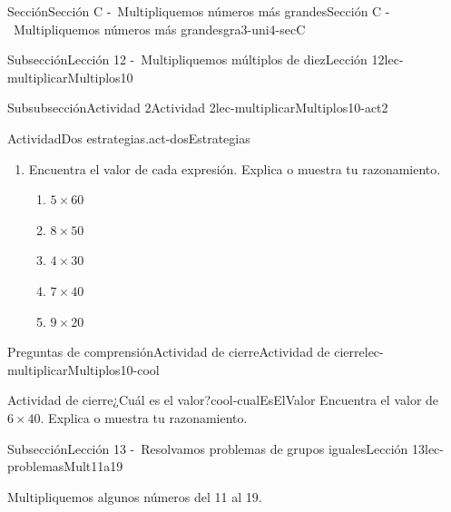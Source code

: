 \documentclass[twoside,10pt,]{article}
\begin{document}
\begin{sectionptx}{Sección}{Sección C -~Multipliquemos números más grandes}{}{Sección C -~Multipliquemos números más grandes}{}{}{gra3-uni4-secC}
\begin{subsectionptx}{Subsección}{Lección 12 -~Multipliquemos múltiplos de diez}{}{Lección 12}{}{}{lec-multiplicarMultiplos10}
\begin{subsubsectionptx}{Subsubsección}{Actividad 2}{}{Actividad 2}{}{}{lec-multiplicarMultiplos10-act2}
\begin{activity}{Actividad}{Dos estrategias.}{act-dosEstrategias}
\begin{enumerate}
%
\begin{itemize}[label=\textbullet]
\item{}Jada contó: 30, 60, 90, 120, 150, 180, 210, 240 y dijo que la respuesta es 240.%
\item{}Kiran dijo que él sabía que \(8\times 3\) es 24, luego encontró \(24\times 10\) y obtuvo 240.%
\end{itemize}
¿En qué se parecen las estrategias de Jada y de Kiran? ¿En qué son diferentes?%
\item{}Encuentra el valor de cada expresión. Explica o muestra tu razonamiento.%
%
\begin{enumerate}
\item{}\(\displaystyle 5 \times 60\)%
\item{}\(\displaystyle 8 \times 50\)%
\item{}\(\displaystyle 4 \times 30\)%
\item{}\(\displaystyle 7 \times 40\)%
\item{}\(\displaystyle 9 \times 20\)%
\end{enumerate}
\end{enumerate}
\end{activity}%
\end{subsubsectionptx}
%
%
\typeout{************************************************}
\typeout{************************************************}
%
\begin{reading-questions-subsubsection}{Preguntas de comprensión}{Actividad de cierre}{}{Actividad de cierre}{}{}{lec-multiplicarMultiplos10-cool}
\begin{project}{Actividad de cierre}{¿Cuál es el valor?}{cool-cualEsElValor}%
Encuentra el valor de \(6\times 40\). Explica o muestra tu razonamiento.%
\end{project}%
\end{reading-questions-subsubsection}
\end{subsectionptx}
%
%
\typeout{************************************************}
\typeout{************************************************}
%
\begin{subsectionptx}{Subsección}{Lección 13 -~Resolvamos problemas de grupos iguales}{}{Lección 13}{}{}{lec-problemasMult11a19}
\begin{introduction}{}%
Multipliquemos algunos números del 11 al 19.%
\end{introduction}%
%
%
\typeout{************************************************}

\end{subsectionptx}
\end{sectionptx}
\end{document}
